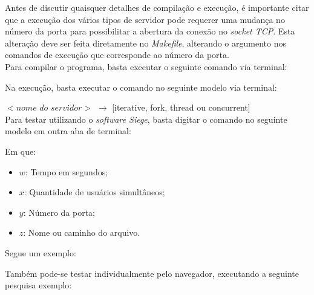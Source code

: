 \documentclass[a4paper, 12pt]{article}
\begin{document}
Antes de discutir quaisquer detalhes de compilação e execução, é importante citar que a execução dos vários tipos de servidor pode requerer uma mudança no número da porta para possibilitar a abertura da conexão no \emph{socket TCP}. Esta alteração deve ser feita diretamente no \emph{Makefile}, alterando o argumento nos comandos de execução que corresponde ao número da porta.\\

\noindent Para compilar o programa, basta executar o seguinte comando via terminal:

\begin{center}
\end{center}

\noindent Na execução, basta executar o comando no seguinte modelo via terminal:

\begin{center}
\end{center}

\noindent $<\textit{nome do servidor}>$ \(\rightarrow\) [iterative, fork, thread ou concurrent]\\

\noindent Para testar utilizando o \emph{software Siege}, basta digitar o comando no seguinte modelo em outra aba de terminal:

\begin{center}
\end{center}

\pagebreak

\noindent Em que:
\begin{itemize}
    \item \(w\): Tempo em segundos;
    \item \(x\): Quantidade de usuários simultâneos;
    \item \(y\): Número da porta;
    \item \(z\): Nome ou caminho do arquivo.
\end{itemize}

\noindent Segue um exemplo: 

\begin{center}
\end{center}

\noindent Também pode-se testar individualmente pelo navegador, executando a seguinte pesquisa exemplo: 
\end{document}
